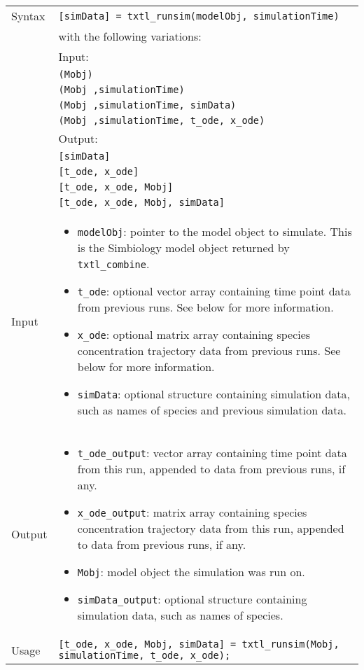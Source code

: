 		\begin{tabular}{p{2cm}|p{13cm}}
			Syntax & \texttt{[simData] = txtl\_runsim(modelObj, simulationTime)}\\
			& with the following variations: \\
			& Input: \\
			& \texttt{(Mobj)}\\
			& \texttt{(Mobj ,simulationTime)}\\
			& \texttt{(Mobj ,simulationTime, simData)}\\			
			& \texttt{(Mobj ,simulationTime, t\_ode, x\_ode)}\\
			& Output: \\
			& \texttt{[simData]}\\
			& \texttt{[t\_ode, x\_ode]}\\
			& \texttt{[t\_ode, x\_ode, Mobj]}		\\	
			& \texttt{[t\_ode, x\_ode, Mobj, simData]}	\\ 
			\hline		
			
			Input &  \begin{itemize}
				\item \texttt{modelObj}: pointer to the model object to simulate. This is the Simbiology model object returned by \texttt{txtl\_combine}.
				\item \texttt{t\_ode}: optional vector array containing time point data from previous runs. See below for more information. 
				\item \texttt{x\_ode}: optional matrix array containing species concentration trajectory data from previous runs. See below for more information.
				\item \texttt{simData}: optional structure containing simulation data, such as names of species and previous simulation data.    
				\end{itemize} \\ \hline
			Output & \begin{itemize}
				\item \texttt{t\_ode\_output}: vector array containing time point data from this run, appended to data from previous runs, if any. 
				\item \texttt{x\_ode\_output}: matrix array containing species concentration trajectory data from this run, appended to data from previous runs, if any.
				\item \texttt{Mobj}: model object the simulation was run on. 
				\item \texttt{simData\_output}: optional structure containing simulation data, such as names of species.    
				\end{itemize} \\ \hline
			Usage & \texttt{[t\_ode, x\_ode, Mobj, simData] = txtl\_runsim(Mobj, simulationTime, t\_ode, x\_ode);}\\
			\end{tabular}
